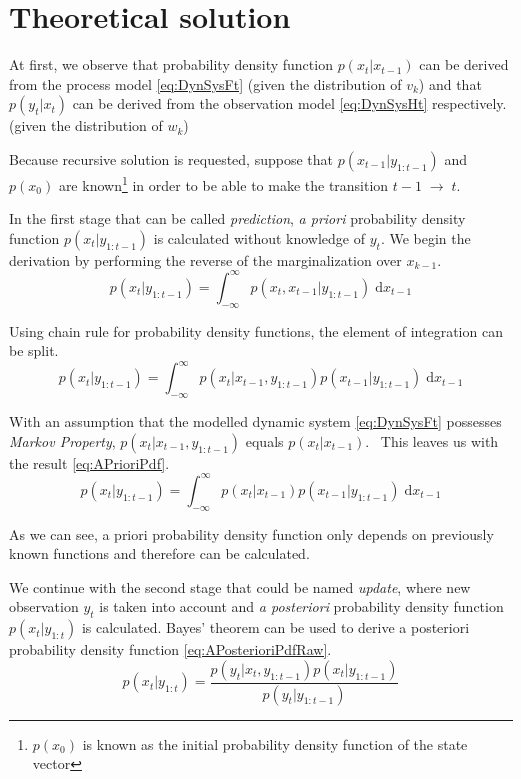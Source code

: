 \documentclass[a4paper,12pt,oneside]{report}
\newcommand{\pdf}{probability density function}
\newcommand{\pdfs}{probability density functions}
\begin{document}
\section{Theoretical solution}

At first, we observe that {\pdf} \(p(x_t|x_{t-1})\) can be derived from the process model
\eqref{eq:DynSysFt} (given the distribution of \(v_k\)) and that \(p(y_t|x_t)\) can be derived from
the observation model \eqref{eq:DynSysHt} respectively. (given the distribution of \(w_k\))

Because recursive solution is requested, suppose that \(p(x_{t-1}|y_{1:t-1})\) and
\(p(x_0)\) are known\footnote{\(p(x_0)\) is known as the initial {\pdf} of the state vector} in
order to be able to make the transition \(t-1 \; \rightarrow \; t\).

In the first stage that can be called \emph{prediction}, \emph{a priori} {\pdf}
\(p(x_t | y_{1:t-1})\) is calculated without knowledge of \(y_t\). We begin the derivation by
performing the reverse of the marginalization over \(x_{k-1}\).
\begin{equation*}
	p(x_t | y_{1:t-1}) = \int_{-\infty}^{\infty} p(x_t, x_{t-1} | y_{1:t-1}) \; \mathrm{d} x_{t-1}
\end{equation*}

Using chain rule for {\pdfs}, the element of integration can be split.
\begin{equation*}
	p(x_t | y_{1:t-1}) = \int_{-\infty}^{\infty} p(x_t | x_{t-1}, y_{1:t-1}) p(x_{t-1} | y_{1:t-1}) \; \mathrm{d} x_{t-1}
\end{equation*}

With an assumption that the modelled dynamic system \eqref{eq:DynSysFt} possesses
\emph{Markov Property}, \(p(x_t | x_{t-1}, y_{1:t-1})\) equals \(p(x_t | x_{t-1})\).~\cite{AruMasGor:02}
This leaves us with the result \eqref{eq:APrioriPdf}.
\begin{equation} \label{eq:APrioriPdf}
	p(x_t | y_{1:t-1}) = \int_{-\infty}^{\infty} p(x_t | x_{t-1}) p(x_{t-1} | y_{1:t-1}) \; \mathrm{d} x_{t-1}
\end{equation}

As we can see, a priori {\pdf} only depends on previously known functions and therefore can be
calculated.

We continue with the second stage that could be named \emph{update}, where new observation \(y_t\) is taken into
account and \emph{a posteriori} {\pdf} \(p(x_t | y_{1:t})\) is calculated. Bayes' theorem can be used
to derive a posteriori {\pdf} \eqref{eq:APosterioriPdfRaw}.
\begin{equation} \label{eq:APosterioriPdfRaw}
	p(x_t | y_{1:t}) = \frac{p(y_t | x_t, y_{1:t-1}) p(x_t | y_{1:t-1})}{p(y_t | y_{1:t-1})}
\end{equation}
\end{document}
